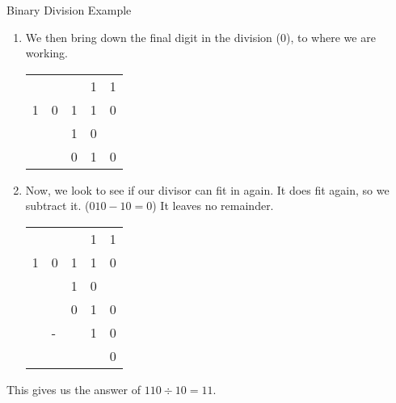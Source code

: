 \begin{example}{Binary Division Example}
\begin{enumerate}
    \item We then bring down the final digit in the division ($0$), to where we are working.
    \begin{table}[H]
        \centering
        \begin{tabularx}{0.2\textwidth}{XXXXX}
              &  &  & 1 & 1 \\
            \cline{3-5}
             1 & 0 & \multicolumn{1}{|X}{1} & 1 & 0 \\
              &  & 1 & 0 & \\
            \cline{3-4}
            &  & 0 & 1 & 0 \\
        \end{tabularx}
    \end{table}
    \item Now, we look to see if our divisor can fit in again. It does fit again, so we subtract it. ($010-10=0$) It leaves no remainder.
    \begin{table}[H]
        \centering
        \begin{tabularx}{0.2\textwidth}{XXXXX}
              &  &  & 1 & 1 \\
            \cline{3-5}
             1 & 0 & \multicolumn{1}{|X}{1} & 1 & 0 \\
              &  & 1 & 0 & \\
            \cline{3-4}
            &  & 0 & 1 & 0 \\
            & - & & 1 & 0 \\
            \cline{4-5}
            & & & & 0\\
        \end{tabularx}
    \end{table}
\end{enumerate}
This gives us the answer of $110 \div 10 = 11$.
\end{example}

